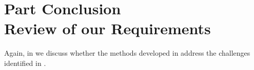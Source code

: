 \begin{subappendices}
%	
%	
%	
	
\end{subappendices}


\chapter*{Part Conclusion\\ {\LARGE Review of our Requirements}}

Again, in  we discuss whether the methods developed in  address the challenges identified in .

